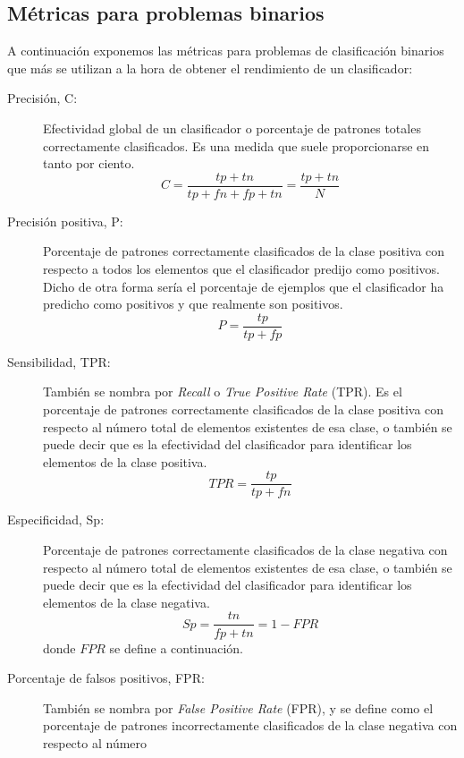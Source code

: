 \subsection{Métricas para problemas binarios}\label{metricasbinarios}
\noindent A continuación exponemos las métricas para problemas de clasificación binarios
que más se utilizan a la hora de obtener el rendimiento de un clasificador:
\begin{description}
\item[Precisión, C:] Efectividad global de un
clasificador o	 porcentaje	de patrones totales correctamente
clasificados. Es una medida que suele proporcionarse en tanto por
ciento.
\begin{displaymath}
C=\frac{tp+tn}{tp+fn+fp+tn}=\frac{tp+tn}{N}
\end{displaymath}
\item[Precisión positiva, P:] Porcentaje de patrones correctamente clasificados
de la clase positiva con respecto a todos los elementos que el clasificador predijo como
positivos. Dicho de otra forma sería el porcentaje de ejemplos que el clasificador ha
predicho como positivos y que realmente son positivos.
\begin{displaymath}
P=\frac{tp}{tp+fp}
\end{displaymath}
\item[Sensibilidad, TPR:] También se nombra por \textit{Recall} o
\textit{True Positive Rate} (TPR). Es el porcentaje de patrones correctamente
clasificados de la clase positiva con respecto al número total	de	elementos existentes de
esa clase, o también
se puede decir que es la efectividad del clasificador para identificar los
elementos de la clase positiva.
\begin{displaymath}
TPR=\frac{tp}{tp+fn}
\end{displaymath}
\item[Especificidad, Sp:] Porcentaje de patrones correctamente
clasificados de la
clase negativa con respecto al número total de elementos existentes de esa clase, o
también se puede decir que es la	efectividad del clasificador para identificar los
elementos de la clase negativa.
\begin{displaymath}
Sp=\frac{tn}{fp+tn}=1-FPR
\end{displaymath}
donde $FPR$ se define a continuación.
\item[Porcentaje de falsos positivos, FPR:] También se nombra por \textit{False Positive Rate}
(FPR), y se define como el porcentaje de
patrones incorrectamente clasificados de la clase negativa con respecto al número

\end{description}
